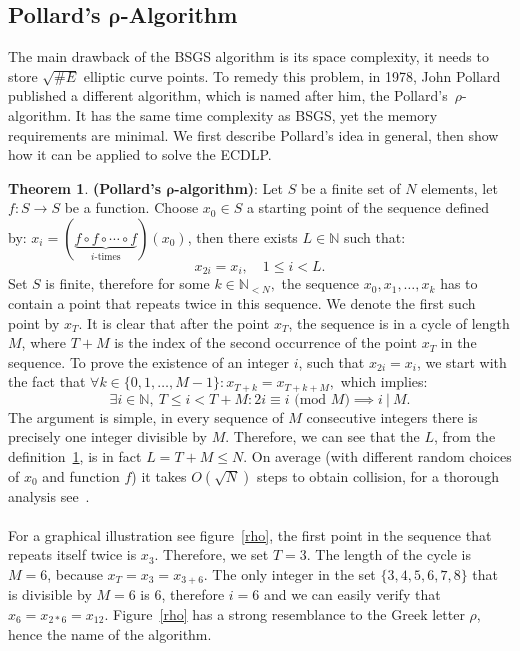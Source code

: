 \documentclass[thesis=M,english]{FITthesis}[2012/10/20]
\theoremstyle{remark}
\theoremstyle{definition}
\newtheorem{theorem}{Theorem}[section]
\begin{document}
\subsection{Pollard's $\boldsymbol\rho$-Algorithm} \label{rhoText}
\noindent The main drawback of the BSGS algorithm is its space complexity, it needs to store $\sqrt{\#E}$ elliptic curve points. To remedy this problem, in 1978, John Pollard published a different algorithm, which is named after him, the Pollard's~$\rho$-algorithm. It has the same time complexity as BSGS, yet the memory requirements are minimal. We first describe Pollard's idea in general, then show how it can be applied to solve the ECDLP.
\begin{theorem}
\label{pol}
 \textbf{(Pollard's $\boldsymbol\rho$-algorithm)}: Let $S$ be a finite set of $N$ elements, let $f: S \to S$ be a function. Choose $x_0 \in S$ a starting point of the sequence defined by: $x_i = (\underbrace{f\circ f \circ \cdots \circ f}_\text{$i$-times})(x_0)$, then there exists $L \in \mathbb{N}$ such that:
 $$
 x_{2i} = x_i, \quad 1\leq i < L.
 $$
Set $S$ is finite, therefore for some $k \in \mathbb{N}_{< N},$ the sequence $x_0, x_1, \ldots, x_k$ has to contain a point that repeats twice in this sequence. We denote the first such point by $x_T$. It is clear that after the point $x_T$, the sequence is in a cycle of length $M$, where $T+M$ is the index of the second occurrence of the point $x_T$ in the sequence. To prove the existence of an integer $i$, such that $x_{2i} = x_i$, we start with the fact that $\forall k \in \{0, 1, \ldots, M-1\}: x_{T+k} = x_{T+k+M},$ which implies:
$$
\exists i \in \mathbb{N},\ T \leq i < T + M: 2i \equiv i \text{ (mod $M$)} \implies i\ |\ M.
$$
The argument is simple, in every sequence of $M$ consecutive integers there is precisely one integer divisible by $M$. Therefore, we can see that the $L$, from the definition~\ref{pol}, is in fact $L= T + M \leq N$. On average (with different random choices of $x_0$ and function $f$) it takes $O(\sqrt{N})$ steps to obtain collision, for a thorough analysis see~\cite{polProb}. \\ \\
\noindent For a graphical illustration see figure~\ref{rho}, the first point in the sequence that repeats itself twice is $x_3$. Therefore, we set $T = 3$. The length of the cycle is $M = 6$, because $x_T = x_3 = x_{3+6}$. The only integer in the set $\{3,4,5,6,7,8\}$ that is divisible by $M = 6$ is $6$, therefore $i=6$ and we can easily verify that $x_6 = x_{2*6} = x_{12}$. Figure~\ref{rho} has a strong resemblance to the Greek letter $\rho$, hence the name of the algorithm.

\end{theorem}
\end{document}
